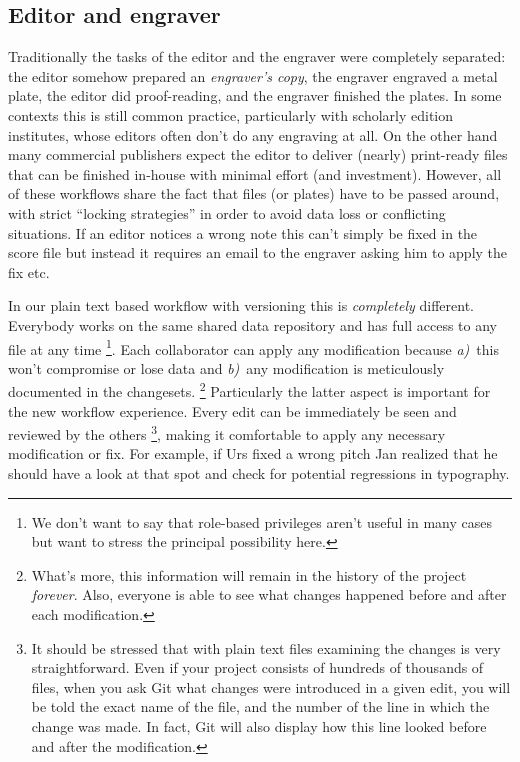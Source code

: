 \documentclass[11pt,a4paper]{article}
\begin{document}
\subsection{Editor and engraver}
Traditionally the tasks of the editor and the engraver were completely separated: the
editor somehow prepared an \emph{engraver's copy}, the engraver engraved a metal plate,
the editor did proof-reading, and the engraver finished the plates. In some contexts
this is still common practice, particularly with scholarly edition institutes, whose
editors often don't do any engraving at all. On the other hand many commercial
publishers expect the editor to deliver (nearly) print-ready files that can be
finished in-house with minimal effort (and investment). However, all of these workflows
share the fact that files (or plates) have to be passed around, with strict
“locking strategies” in order to avoid data loss or conflicting situations. If an editor
notices a wrong note this can't simply be fixed in the score file but instead it requires
an email to the engraver asking him to apply the fix etc.

In our plain text based workflow with versioning this is \emph{completely} different.
Everybody works on the same shared data repository and has full access to any file at any
time%
\footnote{We don't want to say that role-based privileges aren't useful in many cases
but want to stress the principal possibility here.}.
Each collaborator can apply any modification because 
\mbox{\emph{a)} this} won't compromise or lose data and
\mbox{\emph{b)} any} modification is meticulously documented in the changesets.%
\footnote{What's more, this information will remain in the history
of the project \emph{forever}. Also, everyone is able to see what changes
happened before and after each modification.}
Particularly the latter aspect is important for the new workflow experience. 
Every edit can be immediately be seen and reviewed by the others%
\footnote{It should be stressed that with plain text files examining the changes
is very straightforward. Even if your project consists of hundreds of thousands of files,
when you ask Git what changes were introduced in a given edit, you will be told the
exact name of the file, and the number of the line in which the change was made.
In fact, Git will also display how this line looked before and after the modification.},
making it comfortable
to apply any necessary modification or fix. For example, if Urs fixed a wrong pitch Jan
realized that he should have a look at that spot and check for potential regressions
in typography.
\end{document}
